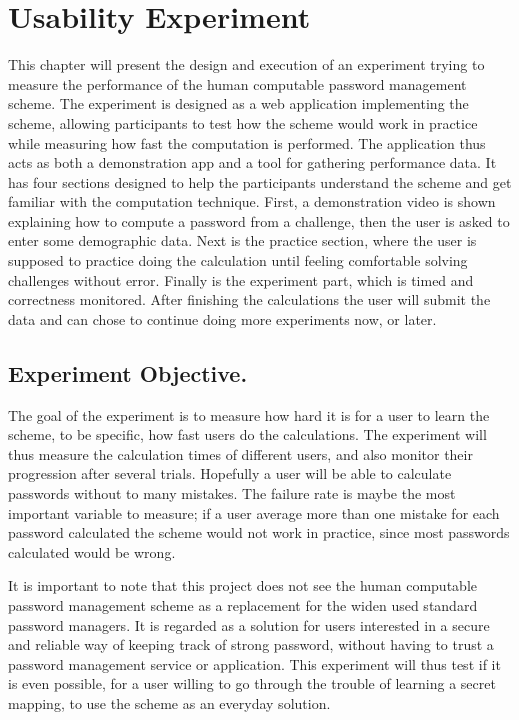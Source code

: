 \chapter{Usability Experiment}\label{ch:experiment}
This chapter will present the design and execution of an experiment trying to measure  the performance of the human computable password management scheme. The experiment is designed as a web application implementing the scheme, allowing participants to test how the scheme would work in practice while measuring how fast the computation is performed. The application thus acts as both a demonstration app and a tool for gathering performance data. It has four sections designed to help the participants understand the scheme and get familiar with the computation technique. First, a demonstration video is shown explaining how to compute a password from a challenge, then the user is asked to enter some demographic data. Next is the practice section, where the user is supposed to practice doing the calculation until feeling comfortable solving challenges without error. Finally is the experiment part, which is timed and correctness monitored. After finishing the calculations the user will submit the data and can chose to continue doing more experiments now, or later.
\section{Experiment Objective.}
The goal of the experiment is to measure how hard it is for a user to learn the scheme, to be specific, how fast users do the calculations. The experiment will thus measure the calculation times of different users, and also monitor their progression after several trials. Hopefully a user will be able to calculate passwords without to many mistakes. The failure rate is maybe the most important variable to measure; if a user average more than one mistake for each password calculated the scheme would not work in practice, since most passwords calculated would be wrong. 
\par It is important to note that this project does not see the human computable password management scheme as a replacement for the widen used standard password managers. It is regarded as a solution for users interested in a secure and reliable way of keeping track of strong password, without having to trust a password management service or application. This experiment will thus test if it is even possible, for a user willing to go through the trouble of learning a secret mapping, to use the scheme as an everyday solution.

